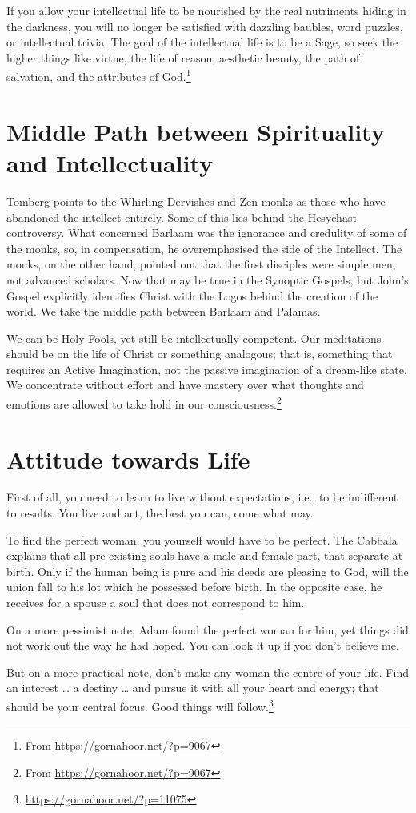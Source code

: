 If you allow your intellectual life to be nourished by the real nutriments hiding in the darkness, you will no longer be satisfied with dazzling baubles, word puzzles, or intellectual trivia. The goal of the intellectual life is to be a Sage, so seek the higher things like virtue, the life of reason, aesthetic beauty, the path of salvation, and the attributes of God.\footnote{From \url{https://gornahoor.net/?p=9067}}

\section{Middle Path between Spirituality and Intellectuality}

Tomberg points to the Whirling Dervishes and Zen monks as those who have abandoned the intellect entirely. Some of this lies behind the Hesychast controversy. What concerned Barlaam was the ignorance and credulity of some of the monks, so, in compensation, he overemphasised the side of the Intellect. The monks, on the other hand, pointed out that the first disciples were simple men, not advanced scholars. Now that may be true in the Synoptic Gospels, but John’s Gospel explicitly identifies Christ with the Logos behind the creation of the world. We take the middle path between Barlaam and Palamas.

We can be Holy Fools, yet still be intellectually competent. Our meditations should be on the life of Christ or something analogous; that is, something that requires an Active Imagination, not the passive imagination of a dream-like state. We concentrate without effort and have mastery over what thoughts and emotions are allowed to take hold in our consciousness.\footnote{From \url{https://gornahoor.net/?p=9067}}

\section{Attitude towards Life}

First of all, you need to learn to live without expectations, i.e., to be indifferent to results. You live and act, the best you can, come what may.

To find the perfect woman, you yourself would have to be perfect. The Cabbala explains that all pre-existing souls have a male and female part, that separate at birth. Only if the human being is pure and his deeds are pleasing to God, will the union fall to his lot which he possessed before birth. In the opposite case, he receives for a spouse a soul that does not correspond to him.

On a more pessimist note, Adam found the perfect woman for him, yet things did not work out the way he had hoped. You can look it up if you don’t believe me.

But on a more practical note, don’t make any woman the centre of your life. Find an interest … a destiny … and pursue it with all your heart and energy; that should be your central focus. Good things will follow.\footnote{\url{https://gornahoor.net/?p=11075}}
